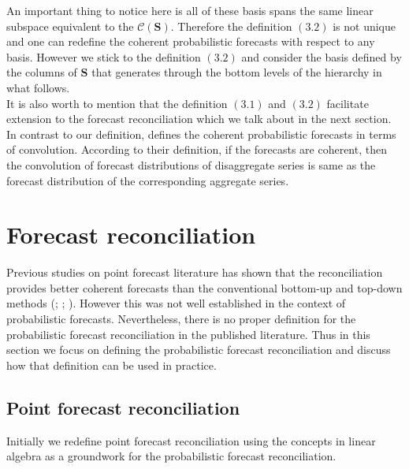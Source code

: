 \documentclass[a4paper, 11pt]{article}
\begin{document}
\noindent
An important thing to notice here is all of these basis spans the same linear subspace equivalent to the $\mathscr{C}(\bm{S})$. Therefore the definition $(3.2)$ is not unique and one can redefine the coherent probabilistic forecasts with respect to any basis. However we stick to the definition $(3.2)$ and consider the basis defined by the columns of $\bm{S}$ that generates through the bottom levels of the hierarchy in what follows.\\ 

\noindent
It is also worth to mention that the definition $(3.1)$ and $(3.2)$ facilitate extension to the forecast reconciliation which we talk about in the next section. In contrast to our definition, \citet{BenTaieb2017} defines the coherent probabilistic forecasts in terms of convolution. According to their definition, if the forecasts are coherent, then the convolution of forecast distributions of disaggregate series is same as the forecast distribution of the corresponding aggregate series.  

\section{Forecast reconciliation}

Previous studies on point forecast literature has shown that the reconciliation provides better coherent forecasts than the conventional bottom-up and top-down methods (\cite{Hyndman2011}; \cite{VanErven2015a}; \cite{Wickramasuriya2017}). However this was not well established in the context of probabilistic forecasts. Nevertheless, there is no proper definition for the probabilistic forecast reconciliation in the published literature. Thus in this section we focus on defining the probabilistic forecast reconciliation and discuss how that definition can be used in practice.  


\subsection{Point forecast reconciliation}

Initially we redefine point forecast reconciliation using the concepts in linear algebra as a groundwork for the probabilistic forecast reconciliation. \\
\end{document}

